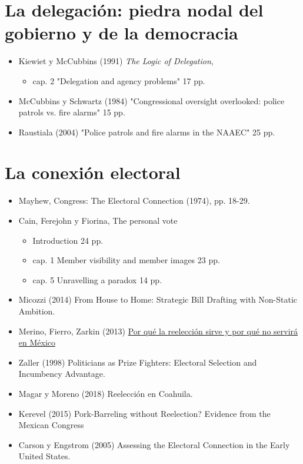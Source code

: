 \documentclass{article}
\begin{document}
\section{La delegación: piedra nodal del gobierno y de la democracia}
\label{sec:org0d327ba}
\begin{itemize}
\item Kiewiet y McCubbins (1991) \emph{The Logic of Delegation},
\begin{itemize}
\item cap. 2 "Delegation and agency problems" 17 pp.
\end{itemize}
\item McCubbins y Schwartz (1984) "Congressional oversight overlooked: police patrols vs. fire alarms" 15 pp.
\item Raustiala (2004) "Police patrols and fire alarms in the NAAEC" 25 pp.
\end{itemize}

\section{La conexión electoral}
\label{sec:org807bfd0}
\begin{itemize}
\item Mayhew, Congress: The Electoral Connection (1974), pp. 18-29.
\item Cain, Ferejohn y Fiorina, The personal vote
\begin{itemize}
\item Introduction 24 pp.
\item cap. 1 Member visibility and member images 23 pp.
\item cap. 5 Unravelling a paradox 14 pp.
\end{itemize}
\item Micozzi (2014) From House to Home: Strategic Bill Drafting with Non-Static Ambition.
\item Merino, Fierro, Zarkin (2013) \href{https://www.animalpolitico.com/blogueros-salir-de-dudas/2013/12/05/por-que-la-reeleccion-sirve-y-por-que-servira-en-mexico/}{Por qué la reelección sirve y por qué no servirá en México}
\item Zaller (1998) Politicians as Prize Fighters: Electoral Selection and Incumbency Advantage.
\item Magar y Moreno (2018) Reelección en Coahuila.
\item Kerevel (2015) Pork-Barreling without Reelection? Evidence from the Mexican Congress
\item Carson y Engstrom (2005) Assessing the Electoral Connection in the Early United States.
\end{itemize}
\end{document}
